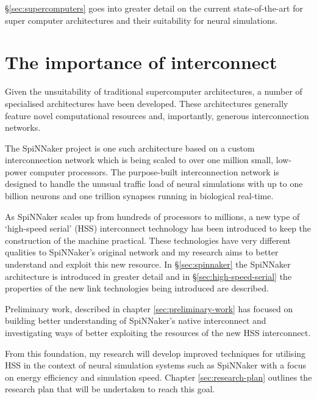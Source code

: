 		\S\ref{sec:supercomputers} goes into greater detail on the current
		state-of-the-art for super computer architectures and their suitability for
		neural simulations.
	
	\section{The importance of interconnect}
		
		Given the unsuitability of traditional supercomputer architectures, a number
		of specialised architectures have been developed. These architectures
		generally feature novel computational resources and, importantly, generous
		interconnection networks.
		
		The SpiNNaker project \cite{furber06} is one such architecture based on a
		custom interconnection network which is being scaled to over one million
		small, low-power computer processors. The purpose-built interconnection
		network is designed to handle the unusual traffic load of neural simulations
		with up to one billion neurons and one trillion synapses running in
		biological real-time.
		
		As SpiNNaker scales up from hundreds of processors to millions, a new type
		of `high-speed serial' (HSS) interconnect technology has been introduced to
		keep the construction of the machine practical. These technologies have very
		different qualities to SpiNNaker's original network and my research aims to
		better understand and exploit this new resource. In \S\ref{sec:spinnaker}
		the SpiNNaker architecture is introduced in greater detail and in
		\S\ref{sec:high-speed-serial} the properties of the new link technologies
		being introduced are described.
		
		
		
		Preliminary work, described in chapter \ref{sec:preliminary-work} has
		focused on building better understanding of SpiNNaker's native interconnect
		and investigating ways of better exploiting the resources of the new HSS
		interconnect.
	
		From this foundation, my research will develop improved techniques for
		utilising HSS in the context of neural simulation systems such as SpiNNaker
		with a focus on energy efficiency and simulation speed. Chapter
		\ref{sec:research-plan} outlines the research plan that will be undertaken
		to reach this goal.
